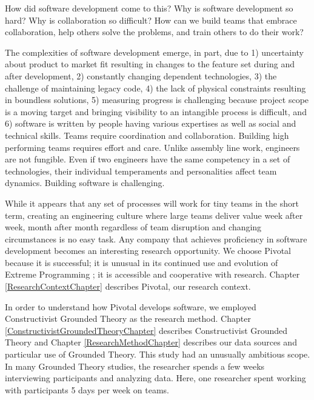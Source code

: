 How did software development come to this? Why is software development so hard? Why is collaboration so difficult? How can we build teams that embrace collaboration, help others solve the problems, and train others to do their work?


The complexities of software development emerge, in part, due to 1) uncertainty about product to market fit resulting in changes to the feature set during and after development, 2) constantly changing dependent technologies, 3) the challenge of maintaining legacy code, 4) the lack of physical constraints resulting in boundless solutions, 5) measuring progress is challenging because project scope is a moving target and bringing visibility to an intangible process is difficult, and 6) software is written by people having various expertises as well as social and technical skills. Teams require coordination and collaboration. Building high performing teams requires effort and care. Unlike assembly line work, engineers are not fungible. Even if two engineers have the same competency in a set of technologies, their individual temperaments and personalities affect team dynamics. Building software is challenging. 


While it appears that any set of processes will work for tiny teams in the short term, creating an engineering culture where large teams deliver value week after week, month after month regardless of team disruption and changing circumstances is no easy task. Any company that achieves proficiency in software development becomes an interesting research opportunity. We choose Pivotal because it is successful; it is unusual in its continued use and evolution of Extreme Programming \cite{BeckExtremeProgramming2004};  it is accessible and cooperative with research. Chapter \ref{ResearchContextChapter} describes Pivotal, our research context. 


In order to understand how Pivotal develops software, we employed Constructivist Grounded Theory as the research method. Chapter \ref{ConstructivistGroundedTheoryChapter} describes Constructivist Grounded Theory and Chapter \ref{ResearchMethodChapter} describes our data sources and particular use of Grounded Theory. This study had an unusually ambitious scope. In many Grounded Theory studies, the researcher spends a few weeks interviewing participants and analyzing data. Here, one researcher spent \durationOfResearchStudyPlural{} working with participants 5 days per week on \numberOfObservedProjects{} teams. 


